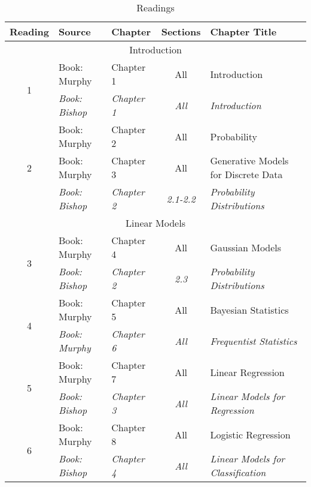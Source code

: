 \documentclass[12pt]{article}
\begin{document}
{    \begin{table}
    \caption{Readings}
    \label{table:readings1}
    \begin{center}
        \begin{tabular}{| c | l | l | c | p{6 cm} |}
            \hline
            Reading & Source & Chapter & Sections & Chapter Title \\
            \hline
            \multicolumn{5}{|c|}{Introduction} \\
            \hline
            \multirow{2}{*}{1} & Book: Murphy & Chapter 1 & All & Introduction \\
                               & \textit{Book: Bishop} & \textit{Chapter 1} & \textit{All} & \textit{Introduction} \\
            \hline
            \multirow{3}{*}{2} & Book: Murphy & Chapter 2 & All & Probability \\
                               & Book: Murphy & Chapter 3 & All & Generative Models for Discrete Data \\
                               & \textit{Book: Bishop} & \textit{Chapter 2} & \textit{2.1-2.2} & \textit{Probability Distributions} \\
            \hline
            \multicolumn{5}{|c|}{Linear Models} \\
            \hline
            \multirow{2}{*}{3} & Book: Murphy & Chapter 4 & All & Gaussian Models \\
                               & \textit{Book: Bishop} & \textit{Chapter 2} & \textit{2.3} & \textit{Probability Distributions} \\
            \hline
            \multirow{2}{*}{4} & Book: Murphy & Chapter 5 & All & Bayesian Statistics \\
                               & \textit{Book: Murphy} & \textit{Chapter 6} & \textit{All} & \textit{Frequentist Statistics} \\
            \hline
            \multirow{2}{*}{5} & Book: Murphy & Chapter 7 & All & Linear Regression \\
                               & \textit{Book: Bishop} & \textit{Chapter 3} & \textit{All} & \textit{Linear Models for Regression} \\
            \hline
            \multirow{2}{*}{6} & Book: Murphy & Chapter 8 & All & Logistic Regression \\
                               & \textit{Book: Bishop} & \textit{Chapter 4} & \textit{All} & \textit{Linear Models for Classification} \\

\end{tabular}
\end{center}
\end{table}}
\end{document}
